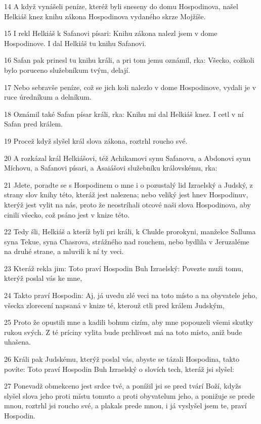 \par 14 A když vynášeli peníze, kteréž byli sneseny do domu Hospodinova, našel Helkiáš knez knihu zákona Hospodinova vydaného skrze Mojžíše.
\par 15 I rekl Helkiáš k Safanovi písari: Knihu zákona nalezl jsem v dome Hospodinove. I dal Helkiáš tu knihu Safanovi.
\par 16 Safan pak prinesl tu knihu králi, a pri tom jemu oznámil, rka: Všecko, cožkoli bylo poruceno služebníkum tvým, delají.
\par 17 Nebo sebravše peníze, což se jich koli nalezlo v dome Hospodinove, vydali je v ruce úredníkum a delníkum.
\par 18 Oznámil také Safan písar králi, rka: Knihu mi dal Helkiáš knez. I cetl v ní Safan pred králem.
\par 19 Procež když slyšel král slova zákona, roztrhl roucho své.
\par 20 A rozkázal král Helkiášovi, též Achikamovi synu Safanovu, a Abdonovi synu Míchovu, a Safanovi písari, a Asaiášovi služebníku královskému, rka:
\par 21 Jdete, poradte se s Hospodinem o mne i o pozustalý lid Izraelský a Judský, z strany slov knihy této, kteráž jest nalezena; nebo veliký jest hnev Hospodinuv, kterýž jest vylit na nás, proto že neostríhali otcové naši slova Hospodinova, aby cinili všecko, což psáno jest v knize této.
\par 22 Tedy šli, Helkiáš a kteríž byli pri králi, k Chulde prorokyni, manželce Salluma syna Tekue, syna Chasrova, strážného nad rouchem, nebo bydlila v Jeruzaléme na druhé strane, a mluvili k ní ty veci.
\par 23 Kteráž rekla jim: Toto praví Hospodin Buh Izraelský: Povezte muži tomu, kterýž poslal vás ke mne,
\par 24 Takto praví Hospodin: Aj, já uvedu zlé veci na toto místo a na obyvatele jeho, všecka zlorecení napsaná v knize té, kterouž ctli pred králem Judským,
\par 25 Proto že opustili mne a kadili bohum cizím, aby mne popouzeli všemi skutky rukou svých. Z té príciny vylita bude prchlivost má na toto místo, aniž bude uhašena.
\par 26 Králi pak Judskému, kterýž poslal vás, abyste se tázali Hospodina, takto povíte: Toto praví Hospodin Buh Izraelský o slovích tech, kteráž jsi slyšel:
\par 27 Ponevadž obmekceno jest srdce tvé, a ponížil jsi se pred tvárí Boží, kdyžs slyšel slova jeho proti místu tomuto a proti obyvatelum jeho, a ponižuje se prede mnou, roztrhl jsi roucho své, a plakals prede mnou, i já vyslyšel jsem te, praví Hospodin.

